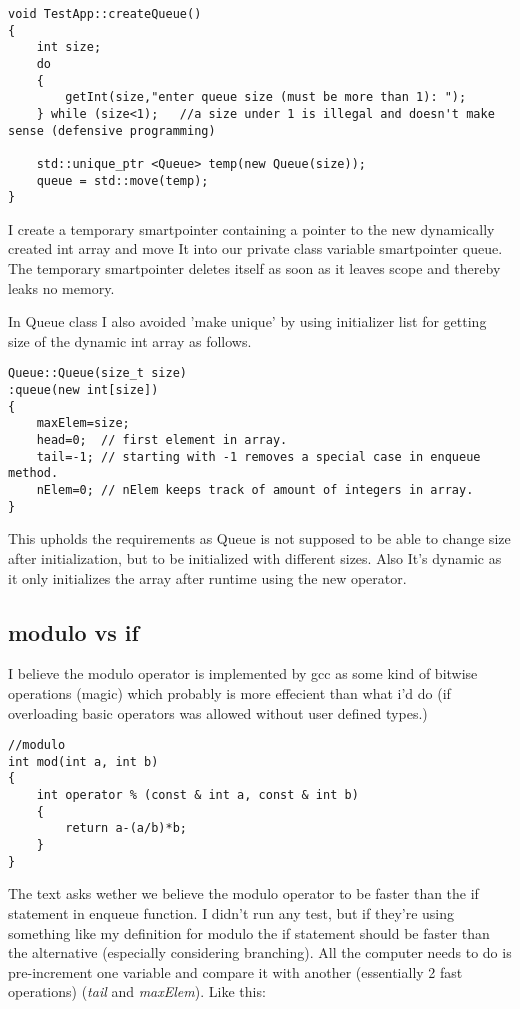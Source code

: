 \documentclass[11pt]{article}
\begin{document}
\begin{lstlisting}
void TestApp::createQueue()
{
	int size;
	do
	{
		getInt(size,"enter queue size (must be more than 1): ");
	} while (size<1); 	//a size under 1 is illegal and doesn't make sense (defensive programming)

	std::unique_ptr <Queue> temp(new Queue(size));
	queue = std::move(temp);
}
\end{lstlisting}

I create a temporary smartpointer containing a pointer to the new dynamically created int array and move It into our private class variable smartpointer queue.
The temporary smartpointer deletes itself as soon as it leaves scope and thereby leaks no memory.

In Queue class I also avoided 'make unique' by using initializer list for getting size of the dynamic int array as follows. 

\begin{lstlisting}
Queue::Queue(size_t size)
:queue(new int[size])
{
	maxElem=size;
	head=0;	 // first element in array.
	tail=-1; // starting with -1 removes a special case in enqueue method.
	nElem=0; // nElem keeps track of amount of integers in array.
}
\end{lstlisting}

This upholds the requirements as Queue is not supposed to be able to change size after initialization, but to be initialized with different sizes. Also It's dynamic as it only initializes the array after runtime using the new operator.

\subsection{modulo vs if}
I believe the modulo operator is implemented by gcc as some kind of bitwise operations (magic) which probably is more effecient than what i'd do (if overloading basic operators was allowed without user defined types.)
\begin{lstlisting}
//modulo
int mod(int a, int b)
{
    int operator % (const & int a, const & int b)
    {
        return a-(a/b)*b;
    }
}
\end{lstlisting}
The text asks wether we believe the modulo operator to be faster than the if statement in enqueue function. I didn't run any test, but if they're using something like my definition for modulo the if statement should be faster than the alternative (especially considering branching). All the computer needs to do is pre-increment one variable and compare it with another (essentially 2 fast operations) (\emph{tail} and  \emph{maxElem}). Like this:
\end{document}
